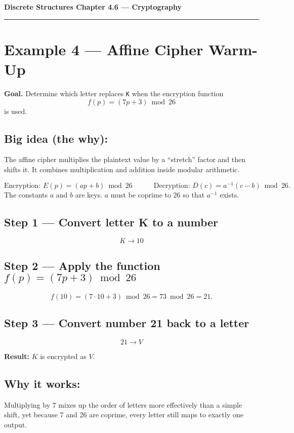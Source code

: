 \documentclass[12pt]{article}
\begin{document}
{\large \textbf{Discrete Structures \quad Chapter 4.6 — Cryptography}}

\hrule
\vspace{0.6em}

\section*{Example 4 — Affine Cipher Warm-Up}

\textbf{Goal.} Determine which letter replaces \texttt{K} when the encryption function
\[
f(p) = (7p + 3) \bmod 26
\]
is used.

\subsection*{Big idea (the why):}
The affine cipher multiplies the plaintext value by a “stretch” factor and then shifts it.
It combines multiplication and addition inside modular arithmetic.

\[
\text{Encryption: } E(p) = (a p + b)\bmod 26
\qquad\quad
\text{Decryption: } D(c) = a^{-1}(c - b)\bmod 26.
\]
The constants \(a\) and \(b\) are keys.  \(a\) must be coprime to 26 so that \(a^{-1}\) exists.

\subsection*{Step 1 — Convert letter K to a number}
\[
K \rightarrow 10
\]

\subsection*{Step 2 — Apply the function \(f(p)=(7p+3)\bmod 26\)}
\[
f(10) = (7\cdot10 + 3)\bmod 26 = 73\bmod26 = 21.
\]

\subsection*{Step 3 — Convert number 21 back to a letter}
\[
21 \rightarrow V
\]

\textbf{Result:} \(K\) is encrypted as \(V\).

\subsection*{Why it works:}
Multiplying by 7 mixes up the order of letters more effectively than a simple shift, yet
because 7 and 26 are coprime, every letter still maps to exactly one output.
\end{document}
